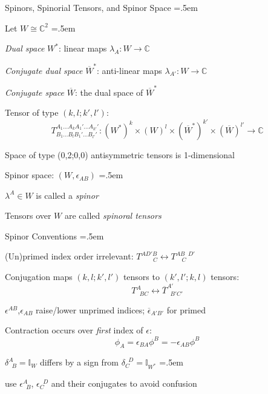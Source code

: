\documentclass[xcolor={dvipsnames}]{beamer}
\let\olditemize=\itemize
\let\endolditemize=\enditemize
\renewenvironment{itemize}{\olditemize \itemsep=.5em }{\endolditemize}
\begin{document}
\begin{frame}{Spinors, Spinorial Tensors, and Spinor Space}
    \begin{itemize}
        \item<2-> Let $W \cong \mathbb{C}^2$
        \begin{itemize}
            \item<3-> \textit{Dual space} $W^*$: linear maps $\lambda_A : W \rightarrow \mathbb{C}$
            \item<4-> \textit{Conjugate dual space} $\overline{W}^*$: anti-linear maps $\lambda_{A'} : W \rightarrow \mathbb{C}$ 
            \item<5-> \textit{Conjugate space} $\overline{W}$: the dual space of $\overline{W}^*$ 
        \end{itemize}
        \item<6-> Tensor of type $(k,l;k',l')$:
        \[ T_{B_1\dots B_l B_1'\dots B_{l'}'}^{A_1\dots A_k A_1'\dots A_{k'}'}: \left(W^*\right)^k \times \left(W\right)^l \times \left(\overline{W}^*\right)^{k'} \times \left(\overline{W}\right)^{l'} \rightarrow \mathbb{C} \]
        \item<7-> Space of type (0,2;0,0) antisymmetric tensors is 1-dimensional
        \item<8-> Spinor space: $(W, \epsilon_{AB})$
        \begin{itemize}
            \item<9-> $\lambda^A \in W$ is called a \textit{spinor}
            \item<10-> Tensors over $W$ are called \textit{spinoral tensors}
        \end{itemize}
    \end{itemize}
\end{frame}

\begin{frame}{Spinor Conventions}
    \begin{itemize}
        \item<2-> (Un)primed index order irrelevant: $T_{\qquad C}^{AD'B} \leftrightarrow T_{\quad C}^{AB\;\;D'}$ 
        \item<3-> Conjugation maps $(k,l;k',l')$ tensors to $(k',l';k,l)$ tensors: $$T_{\;\;BC}^A \leftrightarrow \overline{T}_{\;\;B'C'}^{A'}$$
        \item<3-> $\epsilon^{AB}$,$\epsilon_{AB}$ raise/lower unprimed indices; $\overline{\epsilon}_{A'B'}$ for primed
        \item<4-> Contraction occurs over \textit{first} index of $\epsilon$: \[ \phi_A = \epsilon_{BA}\phi^B = -\epsilon_{AB}\phi^{B} \]
        \item<5-> $\delta_{\;\;B}^A = \mathbb{I}_W$ differs by a sign from $\delta_C^{\;\;D} = \mathbb{I}_{W^*}$
        \begin{itemize}
            \item<6-> \textrightarrow\; use $\epsilon_{\;\;B}^A$, $\epsilon_C^{\;\;D}$ and their conjugates to avoid confusion
        \end{itemize}
    \end{itemize}
\end{frame}
\end{document}
